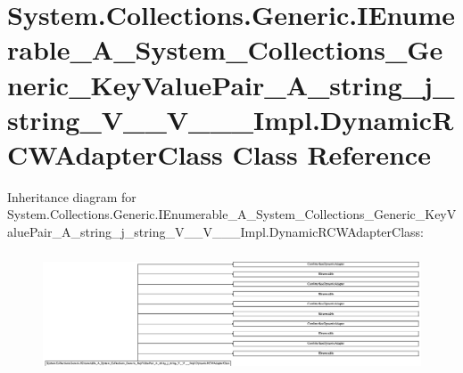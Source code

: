 \hypertarget{class_system_1_1_collections_1_1_generic_1_1_i_enumerable___a___system___collections___generic__1f4a44d92d91e7eab4f6ecba4b57546f}{}\section{System.\+Collections.\+Generic.\+I\+Enumerable\+\_\+\+A\+\_\+\+System\+\_\+\+Collections\+\_\+\+Generic\+\_\+\+Key\+Value\+Pair\+\_\+\+A\+\_\+string\+\_\+j\+\_\+string\+\_\+\+V\+\_\+\+\_\+\+V\+\_\+\+\_\+\+\_\+\+Impl.\+Dynamic\+R\+C\+W\+Adapter\+Class Class Reference}
\label{class_system_1_1_collections_1_1_generic_1_1_i_enumerable___a___system___collections___generic__1f4a44d92d91e7eab4f6ecba4b57546f}
Inheritance diagram for System.\+Collections.\+Generic.\+I\+Enumerable\+\_\+\+A\+\_\+\+System\+\_\+\+Collections\+\_\+\+Generic\+\_\+\+Key\+Value\+Pair\+\_\+\+A\+\_\+string\+\_\+j\+\_\+string\+\_\+\+V\+\_\+\+\_\+\+V\+\_\+\+\_\+\+\_\+\+Impl.\+Dynamic\+R\+C\+W\+Adapter\+Class\+:\begin{figure}[H]
\begin{center}
\leavevmode
\includegraphics[height=3.585565cm]{class_system_1_1_collections_1_1_generic_1_1_i_enumerable___a___system___collections___generic__1f4a44d92d91e7eab4f6ecba4b57546f}
\end{center}
\end{figure}
